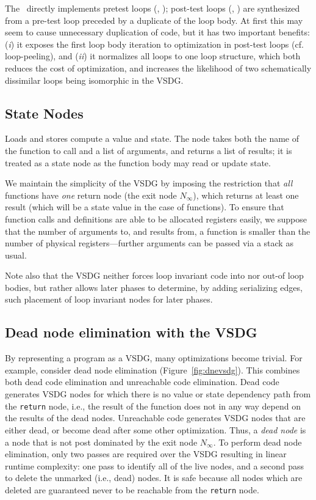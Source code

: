The \Tn\ directly implements pretest loops (, ); 
post-test loops (, ) are synthesized from a pre-test loop preceded by a duplicate of the loop body. 
At first this may seem to cause unnecessary duplication of code, but it has two important benefits: 
({\it i\/}) it exposes the first loop body iteration to optimization in post-test loops (cf. 
loop-peeling), and ({\it ii\/}) it normalizes all loops to one loop structure, which both reduces the cost of optimization, and increases the likelihood of two schematically dissimilar loops being isomorphic in the VSDG.


\subsection{State Nodes}
Loads and stores compute a value and state. 
The  node takes both the name of the function to call and a list of arguments, and returns a list of results; 
it is treated as a state node as the function body may read or update state.

\medskip

We maintain the simplicity of the VSDG by imposing the restriction that \emph{all} functions have \emph{one} return node (the exit node $N_\infty$), which returns at least one result (which will be a state value in the case of  functions). 
To ensure that function calls and definitions are able to be allocated registers easily, we suppose that the number of arguments to, and results from, a function is smaller than the number of physical registers---further arguments can be passed via a stack as usual.

Note also that the VSDG neither forces loop invariant code into nor out-of loop bodies, but rather allows later phases to determine, by adding serializing edges, such placement of loop invariant nodes for later phases.

\subsection{Dead node elimination with the VSDG}
By representing a program as a VSDG, many optimizations become trivial. 
For example, consider dead node elimination (Figure~\ref{fig:dnevsdg}). 
This combines both dead code elimination and unreachable code elimination. 
Dead code generates VSDG nodes for which there is no value or state dependency path from the \texttt{return} node, i.e., the result of the function does not in any way depend on the results of the dead nodes. 
Unreachable code generates VSDG nodes that are either dead, or become dead after some other optimization. 
Thus, a \textit{dead node} is a node that is not post dominated by the exit node $N_{\infty}$. 
To perform dead node elimination, only two passes are required over the VSDG resulting in linear runtime complexity: 
one pass to identify all of the live nodes, and a second pass to delete the unmarked (i.e., dead) nodes. 
It is safe because all nodes which are deleted are guaranteed never to be reachable from the \texttt{return} node.

